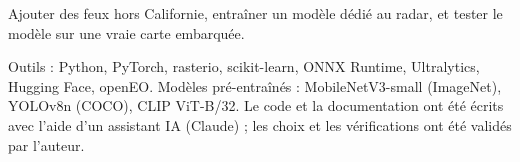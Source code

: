 \documentclass[10pt,a4paper]{article}
\newcommand{\cardtitle}[1]{\MakeUppercase{#1}}
\begin{document}
\begin{definition}[title={\cardtitle{Suite}}]
Ajouter des feux hors Californie, entraîner un modèle dédié au radar, et tester le modèle sur une vraie carte embarquée.
\end{definition}

\begin{complt}
Outils : Python, PyTorch, rasterio, scikit-learn, ONNX Runtime, Ultralytics, Hugging Face, openEO. Modèles pré-entraînés : MobileNetV3-small (ImageNet), YOLOv8n (COCO), CLIP ViT-B/32. Le code et la documentation ont été écrits avec l'aide d'un assistant IA (Claude) ; les choix et les vérifications ont été validés par l'auteur.
\end{complt}
\end{document}

